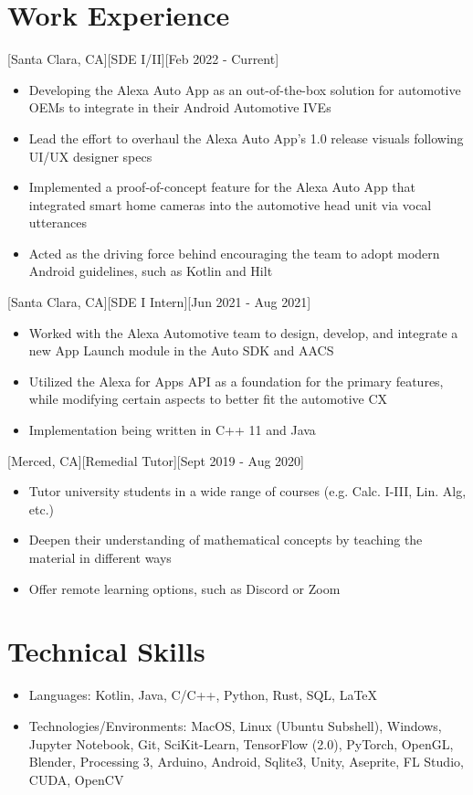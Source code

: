 \documentclass{article}
\begin{document}
\section{Work Experience}
[Santa Clara, CA][SDE I/II][Feb 2022 - Current]
\begin{itemize}
  \item Developing the Alexa Auto App as an out-of-the-box solution for automotive OEMs to integrate in their Android Automotive IVEs
  \item Lead the effort to overhaul the Alexa Auto App's 1.0 release visuals following UI/UX designer specs
  \item Implemented a proof-of-concept feature for the Alexa Auto App that integrated smart home cameras into the automotive head unit via vocal utterances
  \item Acted as the driving force behind encouraging the team to adopt modern Android guidelines, such as Kotlin and Hilt
\end{itemize}
[Santa Clara, CA][SDE I Intern][Jun 2021 - Aug 2021]
\begin{itemize}
  \item Worked with the Alexa Automotive team to design, develop, and integrate a new App Launch module in the Auto SDK and AACS
  \item Utilized the Alexa for Apps API as a foundation for the primary features, while modifying certain aspects to better fit the automotive CX
  \item Implementation being written in C++ 11 and Java
\end{itemize}
[Merced, CA][Remedial Tutor][Sept 2019 - Aug 2020]
\begin{itemize}
  \item Tutor university students in a wide range of courses (e.g. Calc. I-III, Lin. Alg, etc.)
  \item Deepen their understanding of mathematical concepts by teaching the material in different ways
  \item Offer remote learning options, such as Discord or Zoom
\end{itemize}

\section{Technical Skills}
\begin{itemize}
  \item Languages: Kotlin, Java, C/C++, Python, Rust, SQL, \LaTeX{}
  \item Technologies/Environments: MacOS, Linux (Ubuntu Subshell), Windows, Jupyter Notebook, Git, SciKit-Learn, TensorFlow (2.0), PyTorch, OpenGL, Blender, Processing 3, Arduino, Android, Sqlite3, Unity, Aseprite, FL Studio, CUDA, OpenCV
\end{itemize}
\end{document}
